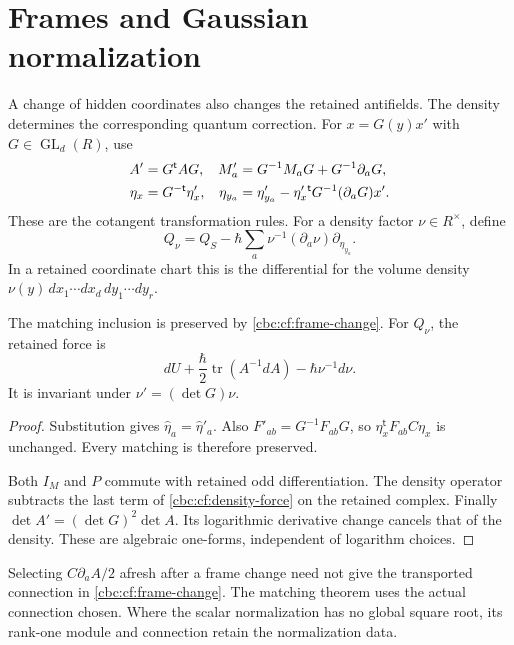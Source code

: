 \section{Frames and Gaussian normalization}
\label{cbc:cf:frames}

A change of hidden coordinates also changes the retained
antifields. The density determines the corresponding quantum
correction. For $x=G(y)x'$ with
$G\in\operatorname{GL}_d(R)$, use
\begin{align}
 A'&=G^{\mathsf t}AG,&
 M'_a&=G^{-1}M_aG+G^{-1}\partial_aG,\notag\\
 \eta_x&=G^{-\mathsf t}\eta_x',&
 \eta_{y_a}&=\eta_{y_a}'-
       \eta_x'{}^{\mathsf t}G^{-1}(\partial_aG)x'.
 \label{cbc:cf:frame-change}
\end{align}
These are the cotangent transformation rules. For a density
factor $\nu\in R^\times$, define
\[
 Q_\nu=Q_S-\hbar\sum_a\nu^{-1}(\partial_a\nu)
                                     \partial_{\eta_{y_a}}.
\]
In a retained coordinate chart this is the differential for
the volume density $\nu(y)\,dx_1\cdots dx_d\,dy_1\cdots dy_r$.

\begin{proposition}\label{cbc:cf:density}
The matching inclusion is preserved by
\eqref{cbc:cf:frame-change}. For $Q_\nu$, the retained force is
\begin{equation}\label{cbc:cf:density-force}
 dU+\frac{\hbar}{2}\operatorname{tr}(A^{-1}dA)
                                    -\hbar\nu^{-1}d\nu.
\end{equation}
It is invariant under $\nu'=(\det G)\nu$.
\end{proposition}
\begin{proof}
Substitution gives $\widehat\eta_a=\widehat\eta'_a$.
Also $F'_{ab}=G^{-1}F_{ab}G$, so
$\eta_x^{\mathsf t}F_{ab}C\eta_x$ is unchanged.
Every matching is therefore preserved.

Both $I_M$ and $P$ commute with retained odd differentiation.
The density operator subtracts the last term of
\eqref{cbc:cf:density-force} on the retained complex.
Finally $\det A'=(\det G)^2\det A$.
Its logarithmic derivative change cancels that of the density.
These are algebraic one-forms, independent of logarithm choices.
\end{proof}

Selecting $C\partial_aA/2$ afresh after a frame change need not
give the transported connection in \eqref{cbc:cf:frame-change}.
The matching theorem uses the actual connection chosen.
Where the scalar normalization has no global square root, its
rank-one module and connection retain the normalization data.

